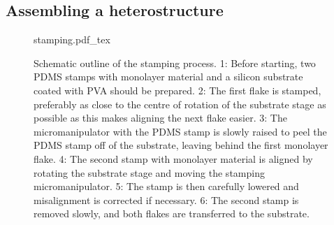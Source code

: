 \subsection{Assembling a heterostructure}
\begin{figure}[h]
	\centering
	\def\svgwidth{1\linewidth}
	{stamping.pdf_tex}
	\caption{Schematic outline of the stamping process. 1: Before starting, two PDMS stamps with monolayer material and a silicon substrate coated with PVA should be prepared. 2: The first flake is stamped, preferably as close to the centre of rotation of the substrate stage as possible as this makes aligning the next flake easier. 3: The micromanipulator with the PDMS stamp is slowly raised to peel the PDMS stamp off of the substrate, leaving behind the first monolayer flake. 4: The second stamp with monolayer material is aligned by rotating the substrate stage and moving the stamping micromanipulator. 5: The stamp is then carefully lowered and misalignment is corrected if necessary. 6: The second stamp is removed slowly, and both flakes are transferred to the substrate.}
	\label{fig:stamping_process}
\end{figure}

